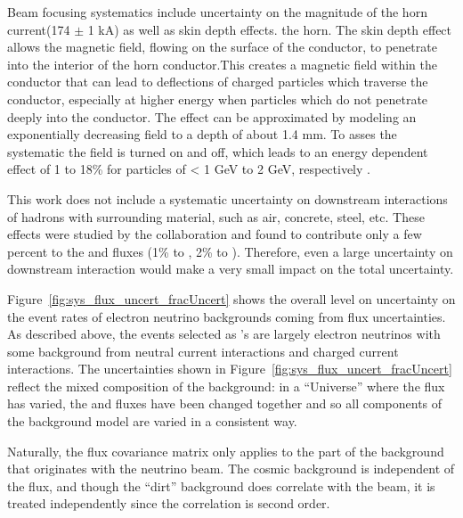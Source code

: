 Beam focusing systematics include uncertainty on the magnitude of the horn current(174 $\pm$ 1 kA) as well as skin depth effects. the horn. The skin depth effect allows the magnetic field, flowing on the surface of the conductor, to penetrate into the interior of the horn conductor.This creates a magnetic field within the conductor that can lead to deflections of charged particles which traverse the conductor, especially at higher energy  when particles which do not penetrate deeply into the conductor. The effect can be approximated by modeling an exponentially decreasing field to a depth of about 1.4 mm. To asses the systematic the field is turned on and off, which leads to an energy dependent effect of 1 to 18\% for particles of < 1 GeV to 2 GeV, respectively \cite{AguilarArevalo:2008yp}.

This work does not include a systematic uncertainty on downstream interactions of hadrons with surrounding material, such as air, concrete, steel, etc.  These effects were studied by the \MB collaboration and found to contribute only a few percent to the \nue and \numu fluxes (1\% to \numu, 2\% to \nue).  Therefore, even a large uncertainty on downstream interaction would make a very small impact on the total uncertainty.

Figure~\ref{fig:sys_flux_uncert_fracUncert} shows the overall level on uncertainty on the event rates of electron neutrino backgrounds coming from flux uncertainties.  As described above, the events selected as \nue's are largely electron neutrinos with some background from neutral current interactions and charged current \numu interactions.  The uncertainties shown in Figure~\ref{fig:sys_flux_uncert_fracUncert} reflect the mixed composition of the background: in a ``Universe'' where the flux has varied, the \nue and \numu fluxes have been changed together and so all components of the background model are varied in a consistent way.

Naturally, the flux covariance matrix only applies to the part of the background that originates with the neutrino beam.  The cosmic background is independent of the flux, and though the ``dirt'' background does correlate with the beam, it is treated independently since the correlation is second order.

